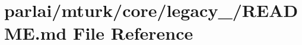 \hypertarget{parlai_2mturk_2core_2legacy__2018_2README_8md}{}\section{parlai/mturk/core/legacy\+\_/\+R\+E\+A\+D\+ME.md File Reference}
\label{parlai_2mturk_2core_2legacy__2018_2README_8md}
